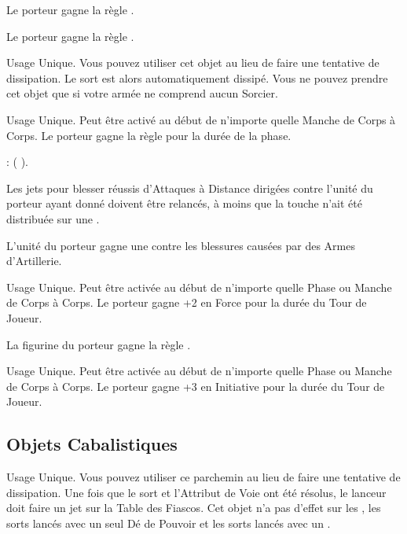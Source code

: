 Le porteur gagne la règle .

Le porteur gagne la règle \lightningreflexes{}.

Usage Unique. Vous pouvez utiliser cet objet au lieu de faire une tentative de dissipation. Le sort est alors automatiquement dissipé. Vous ne pouvez prendre cet objet que si votre armée ne comprend aucun Sorcier.

Usage Unique. Peut être activé au début de n'importe quelle Manche de Corps à Corps. Le porteur gagne la règle \stubborn{} pour la durée de la phase.

 : \firesignature{} (\Pathof{} \fire{}).

\columnbreak

Les jets pour blesser réussis d'Attaques à Distance dirigées contre l'unité du porteur ayant donné  doivent être relancés, à moins que la touche n'ait été distribuée sur une \largetarget{}.

L'unité du porteur gagne une  contre les blessures causées par des Armes d'Artillerie.

Usage Unique. Peut être activée au début de n'importe quelle Phase ou Manche de Corps à Corps. Le porteur gagne +2 en Force pour la durée du Tour de Joueur.

La figurine du porteur gagne la règle \divineattacks{}.

Usage Unique. Peut être activée au début de n'importe quelle Phase ou Manche de Corps à Corps. Le porteur gagne +3 en Initiative pour la durée du Tour de Joueur.

\endpricelist

\newpage
\hypertarget{arcaneitems}{\subsection{Objets Cabalistiques}}
\label{arcane_items}

\startpricelist

Usage Unique. Vous pouvez utiliser ce parchemin au lieu de faire une tentative de dissipation. Une fois que le sort et l'Attribut de Voie ont été résolus, le lanceur doit faire un jet sur la Table des Fiascos. Cet objet n'a pas d'effet sur les \boundspells{}, les sorts lancés avec un seul Dé de Pouvoir et les sorts lancés avec un \overwhelmingpower{}.

